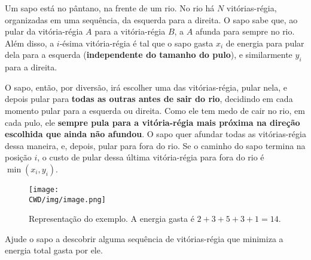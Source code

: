 %

Um sapo está no pântano, na frente de um rio. No rio há $N$ vitórias-régia, organizadas em uma sequência, da esquerda para a direita. O sapo sabe que, ao pular da vitória-régia $A$ para a vitória-régia $B$, a $A$ afunda para sempre no rio. Além disso, a $i$-ésima vitória-régia é tal que o sapo gasta $x_i$ de energia para pular dela para a esquerda (\textbf{independente do tamanho do pulo}), e similarmente $y_i$ para a direita.

O sapo, então, por diversão, irá escolher uma das vitórias-régia, pular nela, e depois pular para \textbf{todas as outras antes de sair do rio}, decidindo em cada momento pular para a esquerda ou direita. Como ele tem medo de cair no rio, em cada pulo, ele \textbf{sempre pula para a vitória-régia mais próxima na direção escolhida que ainda não afundou}. O sapo quer afundar todas as vitórias-régia dessa maneira, e, depois, pular para fora do rio. Se o caminho do sapo termina na posição $i$, o custo de pular dessa última vitória-régia para fora do rio é $\min(x_i, y_i)$.

\begin{figure}[H]
  \centering
  \texttt{[image: \\CWD/img/image.png]}
  \caption{Representação do exemplo. A energia gasta é $2+3+5+3+1=14$.}
\end{figure}

Ajude o sapo a descobrir alguma sequência de vitórias-régia que minimiza a energia total gasta por ele.

%
%

%
%



\sampleio
